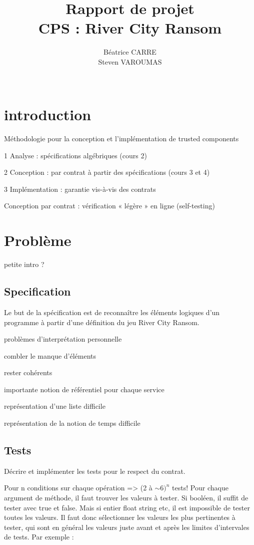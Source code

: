 \documentclass[a4paper, 11pt, notitlepage]{article}
\title{
  \huge Rapport de projet \\
  \huge CPS : River City Ransom\\
}
\author{
  Béatrice CARRE \\
  Steven VAROUMAS \\
  \\
}
\begin{document}
\maketitle
\section*{introduction}
Méthodologie pour la conception et l’implémentation de
trusted components

1 Analyse : spécifications algébriques (cours 2)

2 Conception : par contrat à partir des spécifications (cours 3 et 4)

3 Implémentation : garantie vis-à-vis des contrats

Conception par contrat : vérification « légère » en ligne (self-testing)







\section{Problème}
petite intro ?

\subsection{Specification}
Le but de la spécification est de reconnaître les éléments logiques d’un programme à partir d’une
définition du jeu River City Ransom.

problèmes d’interprétation personnelle

combler le manque d’éléments

rester cohérents

importante notion de référentiel pour chaque service

représentation d’une liste difficile

représentation de la notion de temps difficile


\subsection{Tests}
Décrire et implémenter les tests pour le respect du contrat.

Pour n conditions sur chaque opération => (2 à $\sim 6)^n$ tests!
Pour chaque argument de méthode, il faut trouver les valeurs à tester.
Si booléen, il suffit de tester avec true et false.
Mais si entier float string etc, il est impossible de tester toutes
les valeurs. Il faut donc sélectionner les valeurs les plus
pertinentes à tester, qui sont en général les valeurs juste avant et
après les limites d'intervales de tests.
Par exemple :
\end{document}
